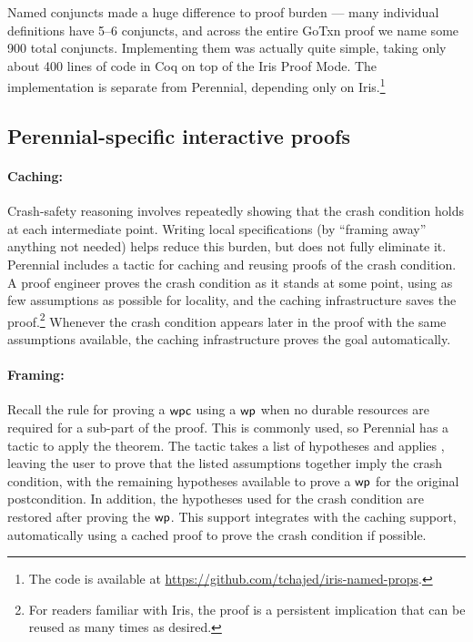 Named conjuncts made a huge difference to proof burden --- many individual
definitions have 5--6 conjuncts, and across the entire GoTxn proof we name some
900 total conjuncts. Implementing them was actually quite simple, taking only
about 400 lines of code in Coq on top of the Iris Proof Mode. The implementation
is separate from Perennial, depending only on Iris.\footnote{The code is
available at \url{https://github.com/tchajed/iris-named-props}.}


\subsection{Perennial-specific interactive proofs}

\paragraph{Caching:} Crash-safety reasoning involves repeatedly showing
that the crash condition holds at each intermediate point.
Writing local specifications (by ``framing away'' anything not needed)
helps reduce this burden, but does not fully eliminate it.
Perennial includes a tactic for caching and reusing proofs of the crash condition.
A proof
engineer proves the crash condition as it stands at some point, using
as few assumptions as possible for locality, and the caching infrastructure saves
the proof.\footnote{For readers familiar with Iris, the proof is a persistent
implication that can be reused as many times as desired.}
Whenever the
crash condition appears later in the proof with the same assumptions available,
the caching infrastructure proves the goal automatically.

\paragraph{Framing:} Recall the  rule for
proving a $\textsf{\upshape wpc}$ using a $\textsf{\upshape wp}$ when no durable resources are required for a
sub-part of the proof. This is commonly used, so Perennial has a 
tactic to apply the theorem. The tactic takes a list of hypotheses and applies
, leaving the user to prove that the listed assumptions
together imply the crash condition, with the remaining hypotheses available to
prove a $\textsf{\upshape wp}$ for the original postcondition. In addition, the hypotheses used
for the crash condition are restored after proving the $\textsf{\upshape wp}$. This support
integrates with the caching support, automatically using a cached proof to prove
the crash condition if possible.

